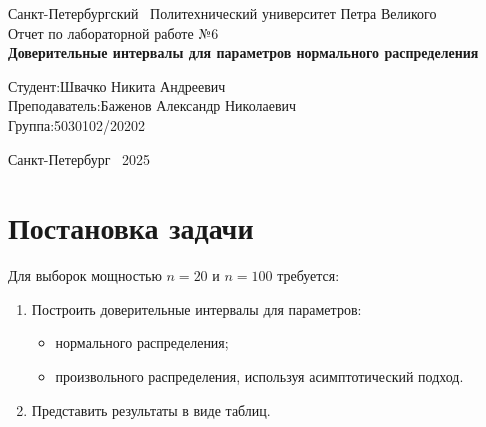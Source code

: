 \documentclass[a4paper]{article}
\begin{document}
    \begin{titlepage}
        \Large
        \begin{center}
            Санкт-Петербургский \ Политехнический университет Петра Великого\\
            \vspace{10em}Отчет по лабораторной работе №6\\
            \vspace{2em}
            \textbf{Доверительные интервалы для параметров нормального распределения}
        \end{center}
        \vspace{6em}
        \hfill\parbox{10cm}{
            \hspace*{2cm}\hspace*{-4cm}Студент:\hfill Швачко Никита Андреевич\\
            \hspace*{2cm}\hspace*{-4cm}Преподаватель:\hfill Баженов Александр Николаевич\\
            \hspace*{2cm}\hspace*{-4cm}Группа:\hfill 5030102/20202
        }
        \vspace{\fill}
        \begin{center}
            Санкт-Петербург \ 2025
        \end{center}
    \end{titlepage}


    \section{Постановка задачи}

    Для выборок мощностью $n=20$ и $n=100$ требуется:

    \begin{enumerate}
        \item Построить доверительные интервалы для параметров:
        \begin{itemize}
            \item нормального распределения;
            \item произвольного распределения, используя асимптотический подход.
        \end{itemize}
        \item Представить результаты в виде таблиц.
    \end{enumerate}
\end{document}
